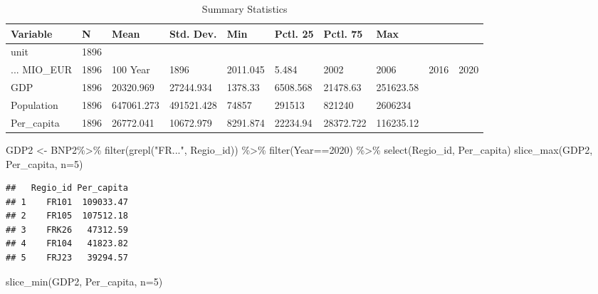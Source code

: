 \documentclass[
]{article}
\newenvironment{Shaded}{\begin{snugshade}}{\end{snugshade}}
\newcommand{\AttributeTok}[1]{\textcolor[rgb]{0.77,0.63,0.00}{#1}}
\newcommand{\DecValTok}[1]{\textcolor[rgb]{0.00,0.00,0.81}{#1}}
\newcommand{\FunctionTok}[1]{\textcolor[rgb]{0.00,0.00,0.00}{#1}}
\newcommand{\NormalTok}[1]{#1}
\newcommand{\OtherTok}[1]{\textcolor[rgb]{0.56,0.35,0.01}{#1}}
\newcommand{\SpecialCharTok}[1]{\textcolor[rgb]{0.00,0.00,0.00}{#1}}
\newcommand{\StringTok}[1]{\textcolor[rgb]{0.31,0.60,0.02}{#1}}
\begin{document}
\begin{table}

\caption{\label{tab:unnamed-chunk-6}Summary Statistics}
\centering
\begin{tabular}[t]{llllllll}
\toprule
Variable & N & Mean & Std. Dev. & Min & Pctl. 25 & Pctl. 75 & Max\\
\midrule
unit & 1896 &  &  &  &  &  & \\
... MIO_EUR & 1896 & 100%
Year & 1896 & 2011.045 & 5.484 & 2002 & 2006 & 2016 & 2020\\
GDP & 1896 & 20320.969 & 27244.934 & 1378.33 & 6508.568 & 21478.63 & 251623.58\\
Population & 1896 & 647061.273 & 491521.428 & 74857 & 291513 & 821240 & 2606234\\
\addlinespace
Per_capita & 1896 & 26772.041 & 10672.979 & 8291.874 & 22234.94 & 28372.722 & 116235.12\\
\bottomrule
\end{tabular}
\end{table}

\begin{Shaded}
\begin{Highlighting}[]
\NormalTok{GDP2 }\OtherTok{\textless{}{-}}\NormalTok{ BNP2}\SpecialCharTok{\%\textgreater{}\%}
  \FunctionTok{filter}\NormalTok{(}\FunctionTok{grepl}\NormalTok{(}\StringTok{"FR..."}\NormalTok{, Regio\_id)) }\SpecialCharTok{\%\textgreater{}\%}
  \FunctionTok{filter}\NormalTok{(Year}\SpecialCharTok{==}\DecValTok{2020}\NormalTok{) }\SpecialCharTok{\%\textgreater{}\%}
  \FunctionTok{select}\NormalTok{(Regio\_id, Per\_capita)}
\FunctionTok{slice\_max}\NormalTok{(GDP2, Per\_capita, }\AttributeTok{n=}\DecValTok{5}\NormalTok{)}
\end{Highlighting}
\end{Shaded}

\begin{verbatim}
##   Regio_id Per_capita
## 1    FR101  109033.47
## 2    FR105  107512.18
## 3    FRK26   47312.59
## 4    FR104   41823.82
## 5    FRJ23   39294.57
\end{verbatim}

\begin{Shaded}
\begin{Highlighting}[]
\FunctionTok{slice\_min}\NormalTok{(GDP2, Per\_capita, }\AttributeTok{n=}\DecValTok{5}\NormalTok{)}
\end{Highlighting}
\end{Shaded}
\end{document}

